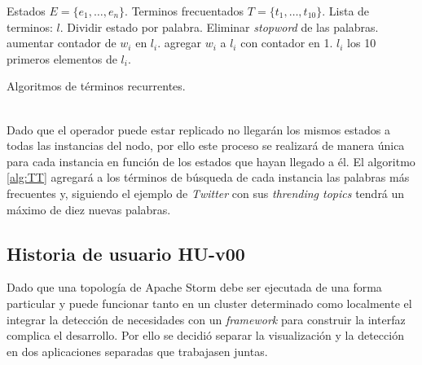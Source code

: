 \begin{algorithm}[H]
	\begin{algorithmic}
		\REQUIRE Estados $E=\{e_{1}, \dots, e_{n} \}$.
		\ENSURE Terminos frecuentados $T=\{t_{1}, \dots, t_{10} \}$.
		\STATE Lista de terminos: $l$.
			\STATE Dividir estado por palabra.
			\STATE Eliminar \textit{stopword} de las palabras.
					\STATE aumentar contador de $w_{i}$ en $l_{i}$.
				\ELSE
					\STATE agregar $w_{i}$ a $l_{i}$ con contador en 1.
				\ENDIF		
			\ENDFOR
		\ENDFOR
			\RETURN $l_{i}$
		\ELSE
			\RETURN los 10 primeros elementos de $l_{i}$.
		\ENDIF
	\end{algorithmic}
	\caption{Algoritmos de términos recurrentes.}
	\label{alg:TT}
\end{algorithm}\vphantom\\

Dado que el operador puede estar replicado no llegarán los mismos estados a todas las instancias del nodo, por ello este proceso se realizará de manera única para cada instancia en función de los estados que hayan llegado a él. El algoritmo \ref{alg:TT} agregará a los términos de búsqueda de cada instancia las palabras más frecuentes y, siguiendo el ejemplo de \textit{Twitter} con sus \textit{thrending topics} tendrá un máximo de diez nuevas palabras.

\subsection{Historia de usuario HU-v00}
\label{subsec:HU-v00}

Dado que una topología de Apache Storm debe ser ejecutada de una forma particular y puede funcionar tanto en un cluster determinado como localmente el integrar la detección de necesidades con un \textit{framework} para construir la interfaz complica el desarrollo. Por ello se decidió separar la visualización y la detección en dos aplicaciones separadas que trabajasen juntas.\\

